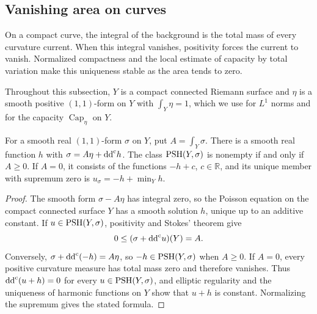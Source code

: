 \subsection{Vanishing area on curves}
\label{sec:curve-vanishing-area}

On a compact curve, the integral of the background is the total mass of every curvature current. When this integral vanishes, positivity forces the current to vanish. Normalized compactness and the local estimate of capacity by total variation make this uniqueness stable as the area tends to zero.

Throughout this subsection, $Y$ is a compact connected Riemann surface and $\eta$ is a smooth positive $(1,1)$-form on $Y$ with $\int_Y\eta=1$, which we use for $L^1$ norms and for the capacity $\operatorname{Cap}_\eta$ on $Y$.

\begin{lemma}\label{lem:curve-background-area}
For a smooth real $(1,1)$-form $\sigma$ on $Y$, put $A=\int_Y\sigma$. There is a smooth real function $h$ with $\sigma=A\eta+\mathrm{dd}^{\mathrm{c}} h$. The class $\mathrm{PSH}(Y,\sigma)$ is nonempty if and only if $A\geq0$. If $A=0$, it consists of the functions $-h+c$, $c\in\mathbb R$, and its unique member with supremum zero is $u_\sigma=-h+\min_Yh$.
\end{lemma}
\begin{proof}
The smooth form $\sigma-A\eta$ has integral zero, so the Poisson equation on the compact connected surface $Y$ has a smooth solution $h$, unique up to an additive constant. If $u\in\mathrm{PSH}(Y,\sigma)$, positivity and Stokes' theorem give
\[
 0\leq(\sigma+\mathrm{dd}^{\mathrm{c}} u)(Y)=A.
\]
Conversely, $\sigma+\mathrm{dd}^{\mathrm{c}}(-h)=A\eta$, so $-h\in\mathrm{PSH}(Y,\sigma)$ when $A\geq0$. If $A=0$, every positive curvature measure has total mass zero and therefore vanishes. Thus $\mathrm{dd}^{\mathrm{c}}(u+h)=0$ for every $u\in\mathrm{PSH}(Y,\sigma)$, and elliptic regularity and the uniqueness of harmonic functions on $Y$ show that $u+h$ is constant. Normalizing the supremum gives the stated formula.
\end{proof}

